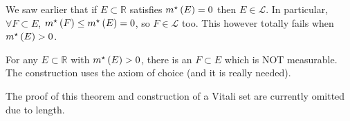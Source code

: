We saw earlier that if $E \subset \mathbb{R}$ satisfies $m^{\star}\left(E\right) = 0$ then $E \in \mathcal{L}$.
In particular, $\forall F \subset E$, $m^{\star}\left(F\right) \leq m^{\star}\left(E\right) = 0$, so $F \in \mathcal{L}$ too.
This however totally fails when $m^{\star}\left(E\right) > 0$.

\begin{theorem}[Vitali]
    For any $E \subset \mathbb{R}$ with $m^{\star}\left(E\right) > 0$, there is an $F \subset E$ which is NOT measurable.
    The construction uses the axiom of choice (and it is really needed).
\end{theorem}

The proof of this theorem and construction of a Vitali set are currently omitted due to length.